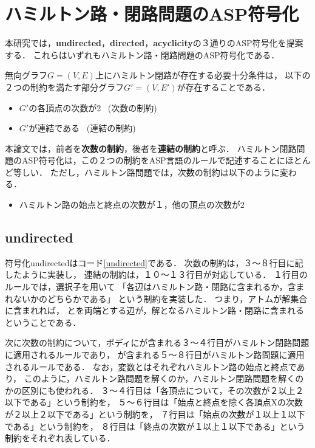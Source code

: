 \section{ハミルトン路・閉路問題のASP符号化}\label{hamiltonianasp}
本研究では，\textbf{undirected}，\textbf{directed}，\textbf{acyclicity}の３通りのASP符号化を提案する．
これらはいずれもハミルトン路・閉路問題のASP符号化である．

無向グラフ$G=(V,E)$上にハミルトン閉路が存在する必要十分条件は，
以下の２つの制約を満たす部分グラフ$G'=(V,E')$が存在することである．\\
\begin{itemize}
\item $G'$の各頂点の次数が2 \ (次数の制約)\\
\item $G'$が連結である \ (連結の制約)\\
\end{itemize}
本論文では，前者を\textbf{次数の制約}，後者を\textbf{連結の制約}と呼ぶ．
ハミルトン閉路問題のASP符号化は，この２つの制約をASP言語のルールで記述することにほとんど等しい．
ただし，ハミルトン路問題では，次数の制約は以下のように変わる．\\
\begin{itemize}
\item ハミルトン路の始点と終点の次数が１，他の頂点の次数が2\\
\end{itemize}

\subsection{undirected}


符号化undirectedはコード\ref{undirected}である．
次数の制約は，３〜８行目に記したように実装し，
連結の制約は，１０〜１３行目が対応している．
１行目のルールでは，選択子を用いて
「各辺はハミルトン路・閉路に含まれるか，含まれないかのどちらかである」
という制約を実装した．
つまり，アトムが解集合に含まれれば，
とを両端とする辺が，解となるハミルトン路・閉路に含まれるということである．

次に次数の制約について，ボディにが含まれる３〜４行目がハミルトン閉路問題に適用されるルールであり，
が含まれる５〜８行目がハミルトン路問題に適用されるルールである．
なお，変数とはそれぞれハミルトン路の始点と終点であり，
このように，ハミルトン路問題を解くのか，ハミルトン閉路問題を解くのかの区別にも使われる．
３〜４行目は「各頂点について，その次数が２以上２以下である」という制約を，
５〜６行目は「始点と終点を除く各頂点Xの次数が２以上２以下である」という制約を，
７行目は「始点の次数が１以上１以下である」という制約を，
８行目は「終点の次数が１以上１以下である」という制約をそれぞれ表している．

